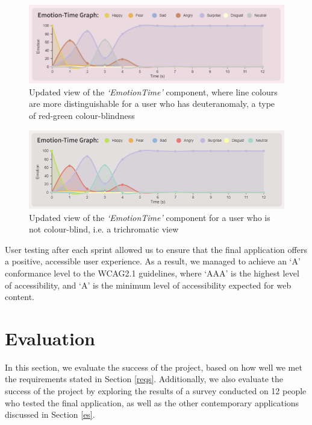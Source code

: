 \documentclass[12pt, a4paper]{article}
\begin{document}
\begin{figure}[H]
    \centering
    \includegraphics[scale=0.80]{images/colourblind.png}
    \caption{Updated view of the \textit{`EmotionTime'} component, where line colours are more distinguishable for a user who has deuteranomaly, a type of red-green colour-blindness}
    \label{fig:colourblind}
\end{figure}

\begin{figure}[H]
    \centering
    \includegraphics[scale=0.80]{images/nocolourblind.png}
    \caption{Updated view of the \textit{`EmotionTime'} component for a user who is not colour-blind, i.e. a trichromatic view}
    \label{fig:nocolourblind}
\end{figure}

User testing after each sprint allowed us to ensure that the final application offers a positive, accessible user experience. As a result, we managed to achieve an `A' conformance level to the WCAG2.1 \citep{WCAG21} guidelines, where `AAA' is the highest level of accessibility, and `A' is the minimum level of accessibility expected for web content.
\clearpage

\section{Evaluation}

In this section, we evaluate the success of the project, based on how well we met the requirements stated in Section \ref{reqs}. Additionally, we also evaluate the success of the project by exploring the results of a survey conducted on 12 people who tested the final application, as well as the other contemporary applications discussed in Section \ref{es}.
\end{document}
